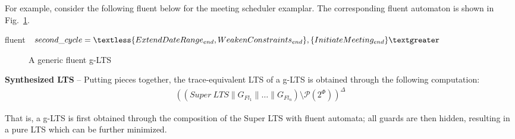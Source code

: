 For example, consider the following fluent below for the meeting scheduler examplar. The corresponding fluent automaton is shown in Fig.~\ref{image:second-cycle-fluent-glts}.
\begin{center}
fluent $second\_cycle = \textless \{ ExtendDateRange_{end}, \newline WeakenConstraints_{end} \},
 \{ InitiateMeeting_{end} \} \textgreater $\\
\end{center}

\begin{figure}[H]\centering
{}
\caption{A generic fluent g-LTS\label{image:second-cycle-fluent-glts}}
\end{figure}

\noindent \textbf{Synthesized LTS} -- Putting pieces together, the trace-equivalent LTS of a g-LTS is obtained through the following computation:
\begin{align*}
\left((Super~LTS \parallel G_{Fl_1} \parallel \ldots \parallel G_{Fl_n}) \setminus \mathcal{P}(2^\Phi)\right)^\Delta
\end{align*}

That is, a g-LTS is first obtained through the composition of the Super LTS with fluent automata; all guards are then hidden, resulting in a pure LTS which can be further minimized.
